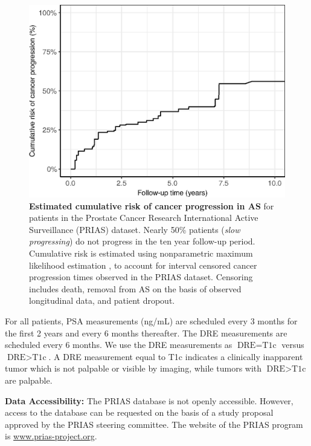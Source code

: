 \begin{figure}[!htb]
\captionsetup{justification=justified}
\centerline{\includegraphics[width=\columnwidth]{images/npmle_plot.eps}}
\caption{\textbf{Estimated cumulative risk of cancer progression in AS} for patients in the Prostate Cancer Research International Active Surveillance (PRIAS) dataset. Nearly 50\% patients (\textit{slow progressing}) do not progress in the ten year follow-up period. Cumulative risk is estimated using nonparametric maximum likelihood estimation \citep{turnbull1976empirical}, to account for interval censored cancer progression times observed in the PRIAS dataset. Censoring includes death, removal from AS on the basis of observed longitudinal data, and patient dropout.}
\label{fig:npmle_plot}
\end{figure}

For all patients, PSA measurements (ng/mL) are scheduled every 3 months for the first 2 years and every 6 months thereafter. The DRE measurements are scheduled every 6 months. We use the DRE measurements as $\mbox{DRE} = \mbox{T1c}$ versus $\mbox{DRE} > \mbox{T1c}$. A DRE measurement equal to T1c\cite{schroder1992tnm} indicates a clinically inapparent tumor which is not palpable or visible by imaging, while tumors with $\mbox{DRE} > \mbox{T1c}$ are palpable.

\textbf{Data Accessibility:} The PRIAS database is not openly accessible. However, access to the database can be requested on the basis of a study proposal approved by the PRIAS steering committee. The website of the PRIAS program is \url{www.prias-project.org}.


